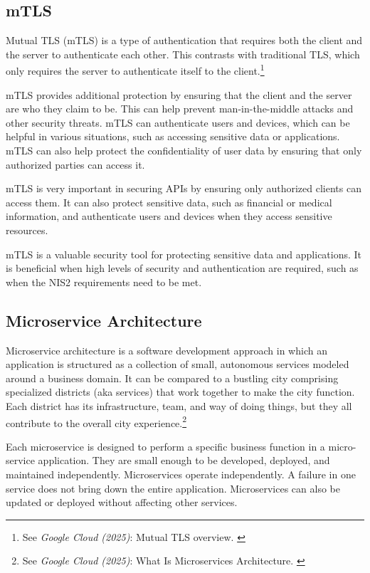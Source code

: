 \subsection{mTLS}

Mutual TLS (mTLS) is a type of authentication that requires both the
client and the server to authenticate each other. This contrasts with
traditional TLS, which only requires the server to authenticate itself
to the client.\footnote{See \textit{Google Cloud (2025)}: Mutual TLS overview. \cite{mutualTls}}

mTLS provides additional protection by ensuring that the client and the
server are who they claim to be. This can help prevent man-in-the-middle
attacks and other security threats. mTLS can authenticate users and
devices, which can be helpful in various situations, such as accessing
sensitive data or applications. mTLS can also help protect the
confidentiality of user data by ensuring that only authorized parties
can access it.

mTLS is very important in securing APIs by ensuring only authorized
clients can access them. It can also protect sensitive data, such as
financial or medical information, and authenticate users and devices
when they access sensitive resources.

mTLS is a valuable security tool for protecting sensitive data and
applications. It is beneficial when high levels of security and
authentication are required, such as when the NIS2 requirements need to
be met.

\subsection{Microservice Architecture}

Microservice architecture is a software development approach in which an
application is structured as a collection of small, autonomous services
modeled around a business domain. It can be compared to a bustling city
comprising specialized districts (aka services) that work together to
make the city function. Each district has its infrastructure, team, and
way of doing things, but they all contribute to the overall city
experience.\footnote{See \textit{Google Cloud (2025)}: What Is Microservices Architecture. \cite{whatIsMS}}

Each microservice is designed to perform a specific business function in
a micro-service application. They are small enough to be developed,
deployed, and maintained independently. Microservices operate
independently. A failure in one service does not bring down the entire
application. Microservices can also be updated or deployed without
affecting other services.

